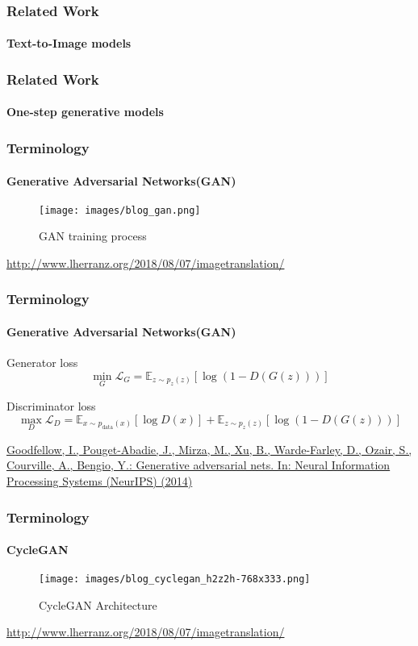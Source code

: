 \documentclass[aspectratio=169, lecture, amberg]{OTHAWbeamer}
\begin{document}
\begin{frame}
\frametitle{Related Work}
\framesubtitle{Text-to-Image models}

\end{frame}

\begin{frame}
\frametitle{Related Work}
\framesubtitle{One-step generative models}

\end{frame}




\begin{frame}
\frametitle{Terminology}
\framesubtitle{Generative Adversarial Networks(GAN)}
\begin{figure}
    \centering
    \texttt{[image: images/blog\_gan.png]}
    \caption{GAN training process}
\end{figure}
\tiny{\footnotemark \url{http://www.lherranz.org/2018/08/07/imagetranslation/}}

\end{frame}

\begin{frame}
\frametitle{Terminology}
\framesubtitle{Generative Adversarial Networks(GAN)}
\begin{block}{Generator loss}
\begin{equation}
\min_G \mathcal{L}_G = \mathbb{E}_{z \sim p_z(z)} [\log(1 - D(G(z)))]
\end{equation}



\end{block}
\begin{block}{Discriminator loss}
\begin{equation}
\max_D \mathcal{L}_D = \mathbb{E}_{x \sim p_{\text{data}}(x)} [\log D(x)] + \mathbb{E}_{z \sim p_z(z)} [\log(1 - D(G(z)))]
\end{equation}\end{block}
\tiny\footnotemark \url{Goodfellow, I., Pouget-Abadie, J., Mirza, M., Xu, B., Warde-Farley, D., Ozair,
S., Courville, A., Bengio, Y.: Generative adversarial nets. In: Neural Information
Processing Systems (NeurIPS) (2014)}
\end{frame}

\begin{frame}
\frametitle{Terminology}
\framesubtitle{CycleGAN}
\begin{figure}
    \centering
    \texttt{[image: images/blog\_cyclegan\_h2z2h-768x333.png]}
    \caption{CycleGAN Architecture}
\end{figure}
\tiny{\footnotemark \url{http://www.lherranz.org/2018/08/07/imagetranslation/}}

\end{frame}
\end{document}
